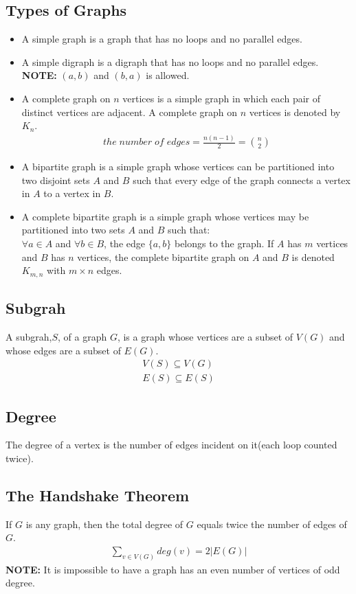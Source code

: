 \documentclass{article}
\begin{document}
\begin{spacing}{1.5}
\section{Types of Graphs}
\begin{itemize}
    \item A simple graph is a graph that has no loops and no parallel edges.
    \item A simple digraph is a digraph that has no loops and no parallel edges.\\
    \textbf{NOTE:} $(a,b)$ and $(b,a)$ is allowed. 
    \item A complete graph on $n$ vertices is a simple graph in which each pair of distinct vertices are adjacent. A complete graph on $n$ vertices is denoted by $K_n$.
    \begin{align}
        the \;number\; of\; edges = \frac{n(n-1)}{2} =\binom{n}{2} 
    \end{align}
    \item A bipartite graph is a simple graph whose vertices can be partitioned into two disjoint sets $A$ and $B$ such that every edge of the graph connects a vertex in $A$ to a vertex in $B$.
    \item A complete bipartite graph is a simple graph whose vertices may be partitioned into two sets $A$ and $B$ such that:\\
    $\forall a \in A$ and $\forall b \in B$, the edge $\{a,b\}$ belongs to the graph. 
    If $A$ has $m$ vertices and $B$ has $n$ vertices, the complete bipartite graph on $A$ and $B$ is denoted $K_{m,n}$ with $m \times n $ edges.
    
\end{itemize}
\subsection{Subgrah}
A subgrah,$S$, of a graph $G$, is a graph whose vertices are a subset of $V(G)$ and whose edges are a subset of $E(G)$. 
\begin{align}
    V(S) \subseteq V(G)\\
    E(S) \subseteq E(S)
\end{align}
\subsection{Degree}
The degree of a vertex is the number of edges incident on it(each loop counted twice). 
\subsection{The Handshake Theorem}
If $G$ is any graph, then the total degree of $G$ equals twice the number of edges of $G$.
\begin{align}
    \sum_{v \in V(G)} deg(v) = 2\left\lvert E(G) \right\rvert 
\end{align}
\textbf{NOTE:} It is impossible to have a graph has an even number of vertices of odd degree. 

\end{spacing}
\end{document}
